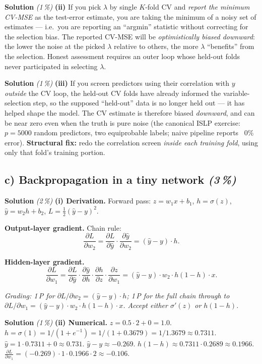 \documentclass[11pt,a4paper]{article}
\newcommand{\subpoints}[1]{\textit{(#1\,\%)}}
\newcommand{\sol}{\noindent\textbf{Solution}}
\begin{document}
\medskip
\sol{} \subpoints{1} \textbf{(ii)} If you pick $\lambda$ by single $K$-fold CV and \emph{report
the minimum CV-MSE} as the test-error estimate, you are taking the minimum of a noisy set of
estimates --- i.e.\ you are reporting an ``argmin'' statistic without correcting for the selection
bias. The reported CV-MSE will be \emph{optimistically biased downward}: the lower the noise at
the picked $\lambda$ relative to others, the more $\lambda$ ``benefits'' from the selection. Honest
assessment requires an outer loop whose held-out folds never participated in selecting $\lambda$.

\medskip
\sol{} \subpoints{1} \textbf{(iii)} If you screen predictors using their correlation with $y$
\emph{outside} the CV loop, the held-out CV folds have already informed the variable-selection
step, so the supposed ``held-out'' data is no longer held out --- it has helped shape the model.
The CV estimate is therefore biased \emph{downward}, and can be near zero even when the truth is
pure noise (the canonical ISLP exercise: $p=5000$ random predictors, two equiprobable labels;
naive pipeline reports ~0\% error). \textbf{Structural fix:} redo the correlation screen
\emph{inside each training fold}, using only that fold's training portion.

\subsection*{c) Backpropagation in a tiny network \subpoints{3}}

\sol{} \subpoints{2} \textbf{(i) Derivation.} Forward pass:
$z = w_1 x + b_1$, $h = \sigma(z)$, $\hat y = w_2 h + b_2$, $L = \tfrac{1}{2}(\hat y - y)^2$.

\textbf{Output-layer gradient.} Chain rule:
$$\frac{\partial L}{\partial w_2}
   = \frac{\partial L}{\partial \hat y}\cdot \frac{\partial \hat y}{\partial w_2}
   = (\hat y - y)\cdot h.$$

\textbf{Hidden-layer gradient.}
$$\frac{\partial L}{\partial w_1}
   = \frac{\partial L}{\partial \hat y}\cdot \frac{\partial \hat y}{\partial h}\cdot
     \frac{\partial h}{\partial z}\cdot \frac{\partial z}{\partial w_1}
   = (\hat y - y)\cdot w_2 \cdot h(1-h)\cdot x.$$

\noindent\emph{Grading: 1\,P for $\partial L/\partial w_2 = (\hat y - y)\cdot h$; 1\,P for the
full chain through to $\partial L/\partial w_1 = (\hat y - y)\cdot w_2 \cdot h(1-h)\cdot x$.
Accept either $\sigma'(z)$ or $h(1-h)$.}

\medskip
\sol{} \subpoints{1} \textbf{(ii) Numerical.}
$z = 0.5\cdot 2 + 0 = 1.0$.
$h = \sigma(1) = 1/(1+e^{-1}) = 1/(1+0.3679) = 1/1.3679 \approx 0.7311$.
$\hat y = 1\cdot 0.7311 + 0 \approx \boxed{0.731}$.
$\hat y - y \approx -0.269$.
$h(1-h) \approx 0.7311\cdot 0.2689 \approx 0.1966$.
$\frac{\partial L}{\partial w_1} = (-0.269)\cdot 1 \cdot 0.1966 \cdot 2 \approx \boxed{-0.106}$.
\end{document}
